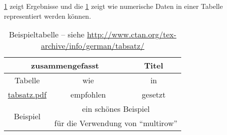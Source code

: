 \cref{tab:Ergebnisse} zeigt Ergebnisse und die \cref{tab:Ergebnisse} zeigt wie numerische Daten in einer Tabelle representiert werden können.
\begin{table}
  \centering
  \begin{tabular}{ccc}
    \toprule
    \multicolumn{2}{c}{\textbf{zusammengefasst}} & \textbf{Titel}                                                          \\ \midrule
    Tabelle                                      & wie                                                           & in      \\
    \url{tabsatz.pdf}                            & empfohlen                                                     & gesetzt \\

    \multirow{2}{*}{Beispiel}                    & \multicolumn{2}{c}{ein schönes Beispiel}                                \\
                                                 & \multicolumn{2}{c}{für die Verwendung von \enquote{multirow}}           \\
    \bottomrule
  \end{tabular}
  \caption[Beispieltabelle]{Beispieltabelle -- siehe \url{http://www.ctan.org/tex-archive/info/german/tabsatz/}}
  \label{tab:Ergebnisse}
\end{table}


